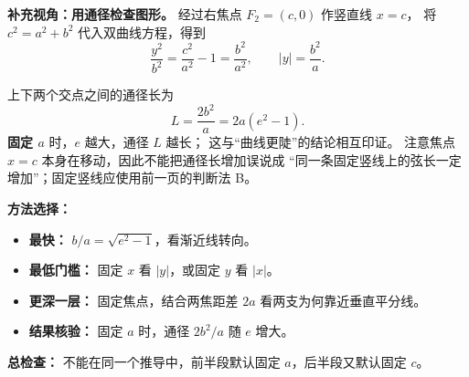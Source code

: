\begin{proofbox}
\textbf{补充视角：用通径检查图形。}
经过右焦点 $F_2=(c,0)$ 作竖直线 $x=c$，
将 $c^2=a^2+b^2$ 代入双曲线方程，得到
\[
 \frac{y^2}{b^2}=\frac{c^2}{a^2}-1
 =\frac{b^2}{a^2},\qquad
 |y|=\frac{b^2}{a}.
\]

上下两个交点之间的通径长为
\[
 \boxed{L=\frac{2b^2}{a}=2a(e^2-1)}.
\]
\textbf{固定 $a$} 时，$e$ 越大，通径 $L$ 越长；
这与“曲线更陡”的结论相互印证。
注意焦点 $x=c$ 本身在移动，因此不能把通径长增加误说成
“同一条固定竖线上的弦长一定增加”；固定竖线应使用前一页的判断法 B。

\medskip
\textbf{方法选择：}
\begin{itemize}
 \item \textbf{最快：} $b/a=\sqrt{e^2-1}$，看渐近线转向。
 \item \textbf{最低门槛：} 固定 $x$ 看 $|y|$，或固定 $y$ 看 $|x|$。
 \item \textbf{更深一层：} 固定焦点，结合两焦距差 $2a$ 看两支为何靠近垂直平分线。
 \item \textbf{结果核验：} 固定 $a$ 时，通径 $2b^2/a$ 随 $e$ 增大。
\end{itemize}
\textbf{总检查：} 不能在同一个推导中，前半段默认固定 $a$，后半段又默认固定 $c$。
\end{proofbox}
\clearpage
